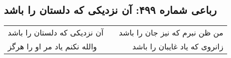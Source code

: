 \begin{center}
\section*{رباعی شماره ۴۹۹: آن نزدیکی که دلستان را باشد}
\label{sec:0499}
\begin{longtable}{l p{0.5cm} r}
آن نزدیکی که دلستان را باشد
&&
من ظن نبرم که نیز جان را باشد
\\
والله نکنم یاد مر او را هرگز
&&
زانروی که یاد غایبان را باشد
\\
\end{longtable}
\end{center}
